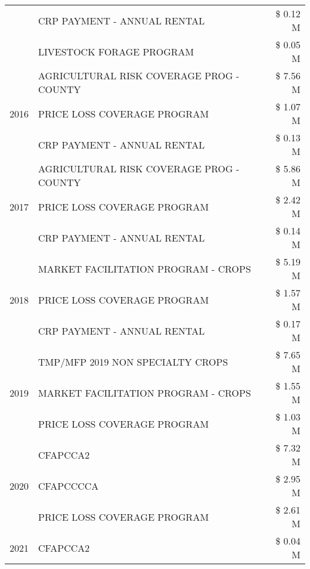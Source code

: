 \begin{tabular}{llr}
 & CRP PAYMENT - ANNUAL RENTAL & \$ 0.12 M \\
 & LIVESTOCK FORAGE PROGRAM & \$ 0.05 M \\
\cline{1-3}
\multirow[t]{3}{*}{2016} & AGRICULTURAL RISK COVERAGE PROG - COUNTY & \$ 7.56 M \\
 & PRICE LOSS COVERAGE PROGRAM & \$ 1.07 M \\
 & CRP PAYMENT - ANNUAL RENTAL & \$ 0.13 M \\
\cline{1-3}
\multirow[t]{3}{*}{2017} & AGRICULTURAL RISK COVERAGE PROG - COUNTY & \$ 5.86 M \\
 & PRICE LOSS COVERAGE PROGRAM & \$ 2.42 M \\
 & CRP PAYMENT - ANNUAL RENTAL & \$ 0.14 M \\
\cline{1-3}
\multirow[t]{3}{*}{2018} & MARKET FACILITATION PROGRAM - CROPS & \$ 5.19 M \\
 & PRICE LOSS COVERAGE PROGRAM & \$ 1.57 M \\
 & CRP PAYMENT - ANNUAL RENTAL & \$ 0.17 M \\
\cline{1-3}
\multirow[t]{3}{*}{2019} & TMP/MFP 2019 NON SPECIALTY CROPS & \$ 7.65 M \\
 & MARKET FACILITATION PROGRAM - CROPS & \$ 1.55 M \\
 & PRICE LOSS COVERAGE PROGRAM & \$ 1.03 M \\
\cline{1-3}
\multirow[t]{3}{*}{2020} & CFAPCCA2 & \$ 7.32 M \\
 & CFAPCCCCA & \$ 2.95 M \\
 & PRICE LOSS COVERAGE PROGRAM & \$ 2.61 M \\
\cline{1-3}
2021 & CFAPCCA2 & \$ 0.04 M \\
\cline{1-3}
\bottomrule
\end{tabular}

